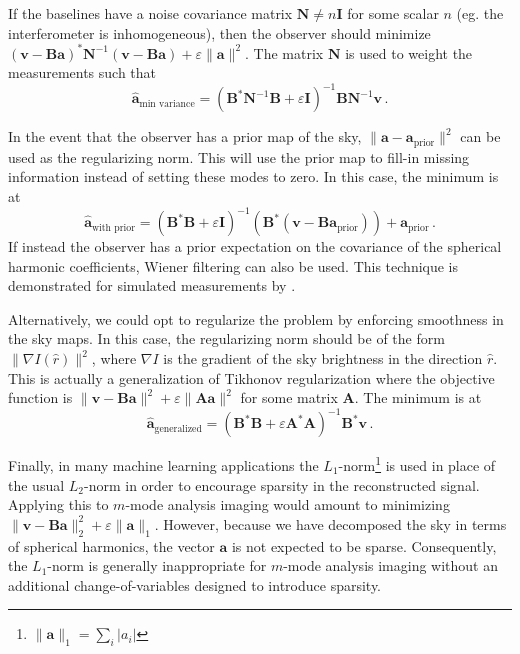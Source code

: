 \documentclass[twocolumn]{aastex61}
\renewcommand{\b}{\pmb}
\begin{document}
If the baselines have a noise covariance matrix $\b N \neq n\b I$ for some scalar $n$ (eg. the
interferometer is inhomogeneous), then the observer should minimize $(\b v-\b B\b a)^*\b N^{-1}(\b
v-\b B\b a) + \varepsilon\|\b a\|^2$. The matrix $\b N$ is used to weight the measurements such that
\begin{equation}
    \b{\hat a}_\text{min variance} = (\b B^*\b N^{-1}\b B + \varepsilon\b I)^{-1}
        \b B\b N^{-1}\b v\,.
\end{equation}

In the event that the observer has a prior map of the sky, $\|\b a - \b a_\text{prior}\|^2$ can be
used as the regularizing norm. This will use the prior map to fill-in missing information instead of
setting these modes to zero. In this case, the minimum is at
\begin{equation}
    \b{\hat a}_\text{with prior} = (\b B^*\b B + \varepsilon\b I)^{-1}
        (\b B^*(\b v - \b B\b a_\text{prior}))
        + \b a_\text{prior}\,.
\end{equation}
If instead the observer has a prior expectation on the covariance of the spherical harmonic
coefficients, Wiener filtering can also be used.  This technique is demonstrated for simulated
measurements by \citet{2016arXiv161203255B}.

Alternatively, we could opt to regularize the problem by enforcing smoothness in the sky maps. In
this case, the regularizing norm should be of the form $\|\nabla I(\hat r)\|^2$, where $\nabla I$ is
the gradient of the sky brightness in the direction $\hat r$. This is actually a generalization of
Tikhonov regularization where the objective function is $\|\b v-\b B\b a\|^2 + \varepsilon\|\b A\b
a\|^2$ for some matrix $\b A$. The minimum is at
\begin{equation}
    \b{\hat a}_\text{generalized} = (\b B^*\b B + \varepsilon\b A^*\b A)^{-1}\b B^*\b v\,.
\end{equation}

Finally, in many machine learning applications the $L_1$-norm\footnote{
    $\|\b a\|_1 = \sum_i |a_i|$
} is used in place of the usual $L_2$-norm in order to encourage sparsity in the reconstructed
signal. Applying this to $m$-mode analysis imaging would amount to minimizing $\|\b v-\b B\b a\|_2^2
+ \varepsilon\|\b a\|_1$. However, because we have decomposed the sky in terms of spherical
harmonics, the vector $\b a$ is not expected to be sparse. Consequently, the $L_1$-norm is generally
inappropriate for $m$-mode analysis imaging without an additional change-of-variables designed to
introduce sparsity.
\end{document}
